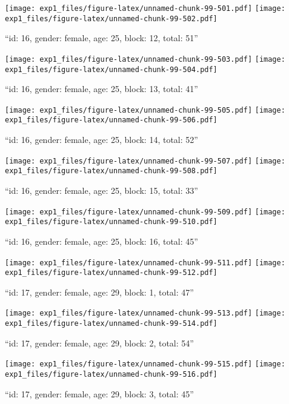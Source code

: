 \documentclass[,]{article}
\begin{document}
\texttt{[image: exp1\_files/figure-latex/unnamed-chunk-99-501.pdf]}
\texttt{[image: exp1\_files/figure-latex/unnamed-chunk-99-502.pdf]}

\newpage
[1] 

``id: 16, gender: female, age: 25, block: 12, total: 51''

\texttt{[image: exp1\_files/figure-latex/unnamed-chunk-99-503.pdf]}
\texttt{[image: exp1\_files/figure-latex/unnamed-chunk-99-504.pdf]}

\newpage
[1] 

``id: 16, gender: female, age: 25, block: 13, total: 41''

\texttt{[image: exp1\_files/figure-latex/unnamed-chunk-99-505.pdf]}
\texttt{[image: exp1\_files/figure-latex/unnamed-chunk-99-506.pdf]}

\newpage
[1] 

``id: 16, gender: female, age: 25, block: 14, total: 52''

\texttt{[image: exp1\_files/figure-latex/unnamed-chunk-99-507.pdf]}
\texttt{[image: exp1\_files/figure-latex/unnamed-chunk-99-508.pdf]}

\newpage
[1] 

``id: 16, gender: female, age: 25, block: 15, total: 33''

\texttt{[image: exp1\_files/figure-latex/unnamed-chunk-99-509.pdf]}
\texttt{[image: exp1\_files/figure-latex/unnamed-chunk-99-510.pdf]}

\newpage
[1] 

``id: 16, gender: female, age: 25, block: 16, total: 45''

\texttt{[image: exp1\_files/figure-latex/unnamed-chunk-99-511.pdf]}
\texttt{[image: exp1\_files/figure-latex/unnamed-chunk-99-512.pdf]}

\newpage
[1] 

``id: 17, gender: female, age: 29, block: 1, total: 47''

\texttt{[image: exp1\_files/figure-latex/unnamed-chunk-99-513.pdf]}
\texttt{[image: exp1\_files/figure-latex/unnamed-chunk-99-514.pdf]}

\newpage
[1] 

``id: 17, gender: female, age: 29, block: 2, total: 54''

\texttt{[image: exp1\_files/figure-latex/unnamed-chunk-99-515.pdf]}
\texttt{[image: exp1\_files/figure-latex/unnamed-chunk-99-516.pdf]}

\newpage
[1] 

``id: 17, gender: female, age: 29, block: 3, total: 45''
\end{document}

